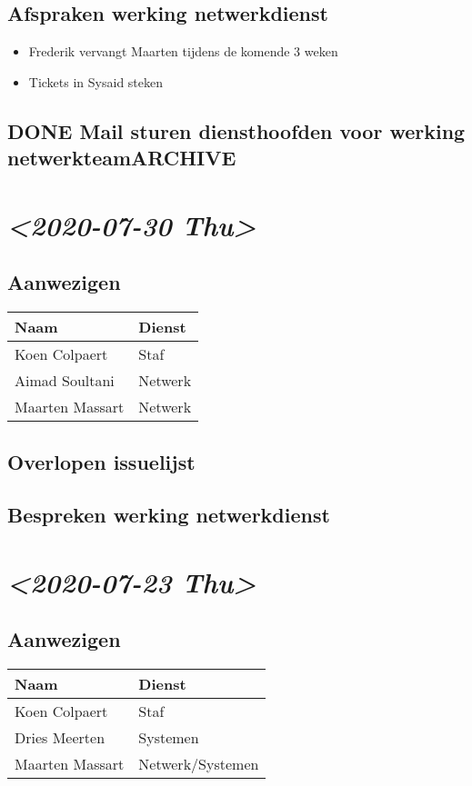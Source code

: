 \documentclass[11pt]{article}
\begin{document}
\subsection{Afspraken werking netwerkdienst}
\label{sec:orgff9053f}
\begin{itemize}
\item Frederik vervangt Maarten tijdens de komende 3 weken
\item Tickets in Sysaid steken
\end{itemize}
\subsection{{\bfseries\sffamily DONE} Mail sturen diensthoofden voor werking netwerkteam\hfill{}\textsc{ARCHIVE}}
\label{sec:org24a7d53}

\section{\textit{<2020-07-30 Thu>}}
\label{sec:org2916801}
\subsection{Aanwezigen}
\label{sec:org21c1414}
\begin{center}
\begin{tabular}{ll}
Naam & Dienst\\
\hline
Koen Colpaert & Staf\\
Aimad Soultani & Netwerk\\
Maarten Massart & Netwerk\\
\end{tabular}
\end{center}

\subsection{Overlopen issuelijst}
\label{sec:org6cfe8c5}
\subsection{Bespreken werking netwerkdienst}
\label{sec:org6f178ba}


\section{\textit{<2020-07-23 Thu>}}
\label{sec:org225c30b}
\subsection{Aanwezigen}
\label{sec:org35f6157}
\begin{center}
\begin{tabular}{ll}
Naam & Dienst\\
\hline
Koen Colpaert & Staf\\
Dries Meerten & Systemen\\
Maarten Massart & Netwerk/Systemen\\
\end{tabular}
\end{center}
\end{document}
